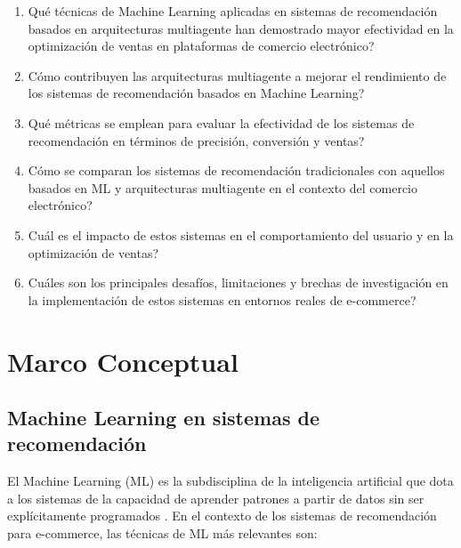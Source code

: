 \documentclass[12pt, a4paper]{article}
\begin{document}
\begin{preguntabox}
\begin{enumerate}[label=\textbf{RQ\arabic*.}, leftmargin=2em]
  \item \textquestiondown Qu\'e t\'ecnicas de Machine Learning aplicadas en
        sistemas de recomendaci\'on basados en arquitecturas multiagente han
        demostrado mayor efectividad en la optimizaci\'on de ventas en
        plataformas de comercio electr\'onico?
  \item \textquestiondown C\'omo contribuyen las arquitecturas multiagente a
        mejorar el rendimiento de los sistemas de recomendaci\'on basados en
        Machine Learning?
  \item \textquestiondown Qu\'e m\'etricas se emplean para evaluar la
        efectividad de los sistemas de recomendaci\'on en t\'erminos de
        precisi\'on, conversi\'on y ventas?
  \item \textquestiondown C\'omo se comparan los sistemas de recomendaci\'on
        tradicionales con aquellos basados en ML y arquitecturas multiagente en
        el contexto del comercio electr\'onico?
  \item \textquestiondown Cu\'al es el impacto de estos sistemas en el
        comportamiento del usuario y en la optimizaci\'on de ventas?
  \item \textquestiondown Cu\'ales son los principales desaf\'ios, limitaciones
        y brechas de investigaci\'on en la implementaci\'on de estos sistemas en
        entornos reales de e-commerce?
\end{enumerate}
\end{preguntabox}

\section{Marco Conceptual}

\subsection{Machine Learning en sistemas de recomendaci\'on}

El Machine Learning (ML) es la subdisciplina de la inteligencia artificial que
dota a los sistemas de la capacidad de aprender patrones a partir de datos sin
ser expl\'icitamente programados \cite{Halachev2024}. En el contexto de los
sistemas de recomendaci\'on para e-commerce, las t\'ecnicas de ML m\'as
relevantes son:
\end{document}
